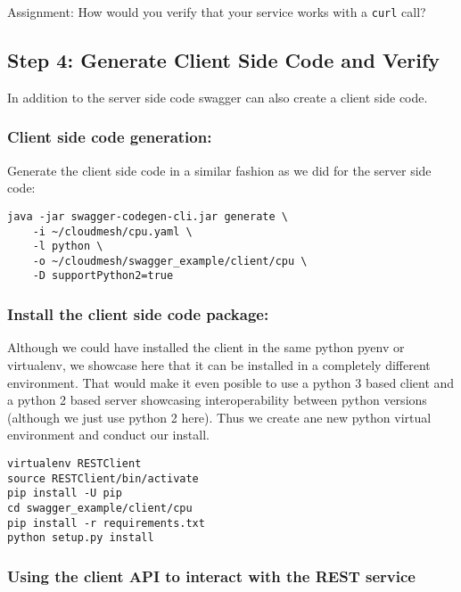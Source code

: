 Assignment: How would you verify that your service works with a
\texttt{curl} call?

\subsection{Step 4: Generate Client Side Code and
Verify}\label{s:step-4-swagger-codegen}

In addition to the server side code swagger can also create a client
side code.

\subsubsection{Client side code
generation:}\label{client-side-code-generation}

Generate the client side code in a similar fashion as we did for the
server side code:

\begin{lstlisting}
java -jar swagger-codegen-cli.jar generate \
    -i ~/cloudmesh/cpu.yaml \
    -l python \
    -o ~/cloudmesh/swagger_example/client/cpu \
    -D supportPython2=true
\end{lstlisting}

\subsubsection{Install the client side code
package:}\label{install-the-client-side-code-package}

Although we could have installed the client in the same python pyenv or
virtualenv, we showcase here that it can be installed in a completely
different environment. That would make it even posible to use a python 3
based client and a python 2 based server showcasing interoperability
between python versions (although we just use python 2 here). Thus we
create ane new python virtual environment and conduct our install.

\begin{lstlisting}
virtualenv RESTClient
source RESTClient/bin/activate
pip install -U pip
cd swagger_example/client/cpu
pip install -r requirements.txt
python setup.py install
\end{lstlisting}

\subsubsection{Using the client API to interact with the REST
service}\label{using-the-client-api-to-interact-with-the-rest-service}

